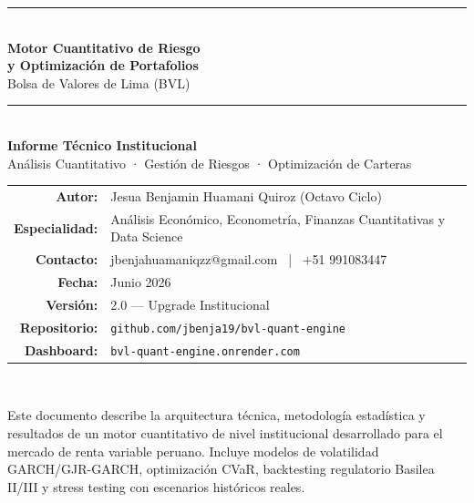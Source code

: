 \documentclass[11pt,a4paper]{article}
\begin{document}
\thispagestyle{empty}
\begin{center}
    \vspace*{1.5cm}
    {\color{accentgold}\rule{\linewidth}{1.5pt}}\\[0.5cm]
    {\Huge\bfseries\color{darkblue} Motor Cuantitativo de Riesgo\\[4pt]
    y Optimización de Portafolios}\\[0.4cm]
    {\Large\color{darkgray} Bolsa de Valores de Lima (BVL)}\\[0.6cm]
    {\color{accentgold}\rule{\linewidth}{1.5pt}}\\[1cm]

    {\large\bfseries\color{darkblue} Informe Técnico Institucional}\\[0.3cm]
    {\normalsize\color{darkgray} Análisis Cuantitativo · Gestión de Riesgos · Optimización de Carteras}\\[2cm]

    \begin{tabular}{rl}
        \textbf{\color{darkblue}Autor:}           & Jesua Benjamin Huamani Quiroz (Octavo Ciclo) \\[4pt]
        \textbf{\color{darkblue}Especialidad:}    & Análisis Económico, Econometría, Finanzas Cuantitativas y Data Science \\[4pt]
        \textbf{\color{darkblue}Contacto:}        & jbenjahuamaniqzz@gmail.com ~|~ +51 991083447 \\[4pt]
        \textbf{\color{darkblue}Fecha:}           & Junio 2026 \\[4pt]
        \textbf{\color{darkblue}Versión:}         & 2.0 — Upgrade Institucional \\[4pt]
        \textbf{\color{darkblue}Repositorio:}     & \texttt{github.com/jbenja19/bvl-quant-engine} \\[4pt]
        \textbf{\color{darkblue}Dashboard:}       & \texttt{bvl-quant-engine.onrender.com} \\
    \end{tabular}\\[2cm]

    \begin{infobox}[Clasificación]
    \small Este documento describe la arquitectura técnica, metodología estadística y resultados
    de un motor cuantitativo de nivel institucional desarrollado para el mercado de renta variable peruano.
    Incluye modelos de volatilidad GARCH/GJR-GARCH, optimización CVaR, backtesting regulatorio
    Basilea II/III y stress testing con escenarios históricos reales.
    \end{infobox}
\end{center}
\newpage
\end{document}
